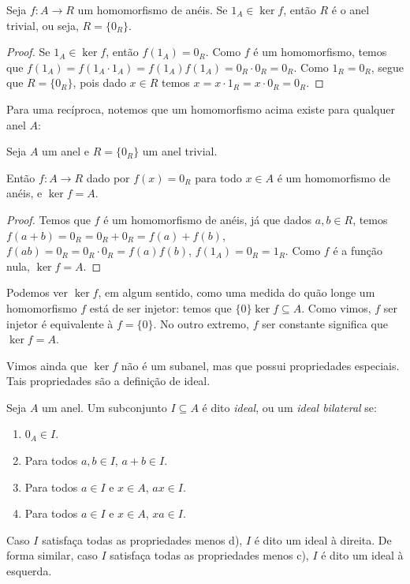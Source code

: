 \begin{prop}
    Seja $f:A\rightarrow R$ um homomorfismo de anéis. Se $1_A \in \ker f$, então $R$ é o anel trivial, ou seja, $R=\{0_R\}$.
\end{prop}

\begin{proof}
    Se $1_A \in \ker f$, então $f(1_A)=0_R$.
    Como $f$ é um homomorfismo, temos que $f(1_A)=f(1_A\cdot 1_A)=f(1_A)f(1_A)=0_R\cdot 0_R=0_R$.
    Como $1_R=0_R$, segue que $R=\{0_R\}$, pois dado $x \in R$ temos $x=x\cdot 1_R=x\cdot 0_R=0_R$.
\end{proof}

Para uma recíproca, notemos que um homomorfismo acima existe para qualquer anel $A$:

\begin{prop}
    Seja $A$ um anel e $R=\{0_R\}$ um anel trivial.
    
    Então $f:A\rightarrow R$ dado por $f(x)=0_R$ para todo $x \in A$ é um homomorfismo de anéis, e $\ker f=A$.
\end{prop}

\begin{proof}
    Temos que $f$ é um homomorfismo de anéis, já que dados $a, b \in R$, temos $f(a+b)=0_R=0_R+0_R=f(a)+f(b)$, $f(ab)=0_R=0_R\cdot 0_R=f(a)f(b)$, $f(1_A)=0_R=1_R$.
    Como $f$ é a função nula, $\ker f=A$.
\end{proof}

Podemos ver $\ker f$, em algum sentido, como uma medida do quão longe um homomorfismo $f$ está de ser injetor: temos que $\{0\}\ker f\subseteq A$.
Como vimos, $f$ ser injetor é equivalente à $f=\{0\}$.
No outro extremo, $f$ ser constante significa que $\ker f = A$.

Vimos ainda que $\ker f$ não é um subanel, mas que possui propriedades especiais. Tais propriedades são a definição de ideal.

\begin{definition}[Ideal]
    Seja $A$ um anel.
    Um subconjunto $I \subseteq A$ é dito \emph{ideal}, ou um \emph{ideal bilateral} se:

    \begin{enumerate}[label=\alph*)]
        \item $0_A \in I$.
        \item Para todos $a, b \in I$, $a+b \in I$.
        \item Para todos $a \in I$ e $x \in A$, $ax \in I$.
        \item Para todos $a \in I$ e $x \in A$, $xa \in I$.
    \end{enumerate}

    Caso $I$ satisfaça todas as propriedades menos d), $I$ é dito um ideal à direita.
    De forma similar, caso $I$ satisfaça todas as propriedades menos c), $I$ é dito um ideal à esquerda.
\end{definition}


